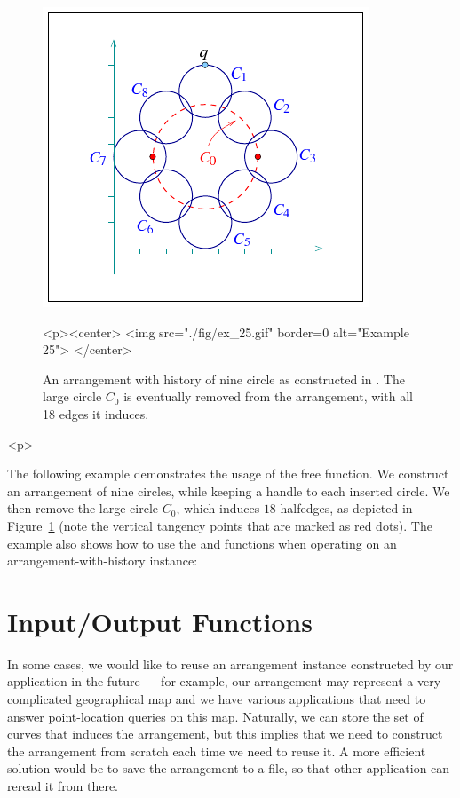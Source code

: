 
\begin{figure}[!htp]
\begin{ccTexOnly}
  \begin{center}
  \includegraphics{Arrangement_2/fig/ex_25}
  \end{center}
\end{ccTexOnly}
\begin{ccHtmlOnly}
  <p><center>
  <img src="./fig/ex_25.gif" border=0 alt="Example 25">
  </center>
\end{ccHtmlOnly}
\caption{An arrangement with history of nine circle as constructed in 
. The large circle $C_0$ is eventually removed from the
arrangement, with all 18 edges it induces.}
\label{arr_fig:ex_25}
\end{figure}

\begin{ccHtmlOnly}<p>\end{ccHtmlOnly}
The following example demonstrates the usage of the free 
function. We construct an arrangement of nine circles, while keeping a handle
to each inserted circle. We then remove the large circle $C_0$, which induces
$18$ halfedges, as depicted in Figure~\ref{arr_fig:ex_25} (note the 
vertical tangency points that are marked as red dots). The example also shows
how to use the  and  functions when
operating on an arrangement-with-history instance:


\section{Input/Output Functions}
\label{arr_sec:io}
%
In some cases, we would like to reuse an arrangement instance constructed
by our application in the future --- for example, our arrangement may
represent a very complicated geographical map and we have various
applications that need to answer point-location queries on this map.
Naturally, we can store the set of curves that induces the arrangement,
but this implies that we need to construct the arrangement from
scratch each time we need to reuse it. A more efficient solution would
be to save the arrangement to a file, so that other application can
reread it from there.

